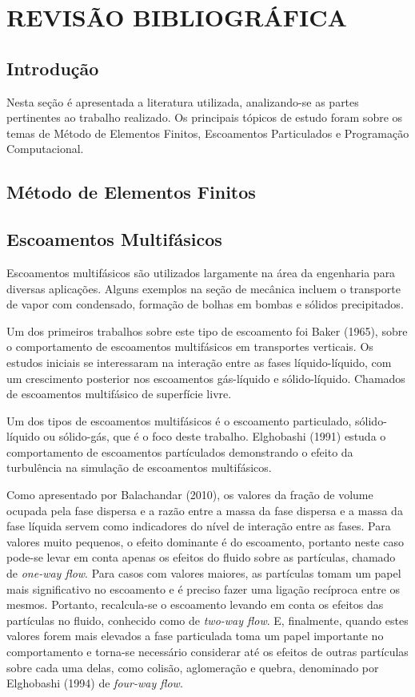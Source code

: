 \chapter{REVISÃO BIBLIOGRÁFICA}
\label{rev_bib}
\section{\textbf{Introdução}}
Nesta seção é apresentada a literatura utilizada, analizando-se as partes pertinentes ao trabalho realizado. Os principais tópicos de estudo foram sobre os temas de Método de Elementos Finitos, Escoamentos Particulados e Programação Computacional. 

\section{\textbf{Método de Elementos Finitos}}


\section{\textbf{Escoamentos Multifásicos}}
Escoamentos multifásicos são utilizados largamente na área da engenharia para diversas aplicações.
Alguns exemplos na seção de mecânica incluem o transporte de vapor com condensado, formação de bolhas em bombas e sólidos precipitados.

Um dos primeiros trabalhos sobre este tipo de escoamento foi Baker (1965)\cite{Baker-1965}, sobre o comportamento de escoamentos multifásicos em transportes verticais.
Os estudos iniciais se interessaram na interação entre as fases líquido-líquido, com um crescimento posterior nos escoamentos gás-líquido e sólido-líquido.
Chamados de escoamentos multifásico de superfície livre.

Um dos tipos de escoamentos multifásicos é o escoamento particulado, sólido-líquido ou sólido-gás, que é o foco deste trabalho.
Elghobashi (1991)\cite{Elghobashi-1991} estuda o comportamento de escoamentos partículados demonstrando o efeito da turbulência na simulação de escoamentos multifásicos.

Como apresentado por Balachandar (2010)\cite{Balachandar-2010}, os valores da fração de volume ocupada pela fase dispersa e a razão entre a massa da fase dispersa e a massa da fase líquida servem como indicadores do nível de interação entre as fases.
Para valores muito pequenos, o efeito dominante é do escoamento, portanto neste caso pode-se levar em conta apenas os efeitos do fluido sobre as partículas, chamado de \textit{one-way flow}.
Para casos com valores maiores, as partículas tomam um papel mais significativo no escoamento e é preciso fazer uma ligação recíproca entre os mesmos.
Portanto, recalcula-se o escoamento levando em conta os efeitos das partículas no fluido, conhecido como de \textit{two-way flow}.
E, finalmente, quando estes valores forem mais elevados a fase particulada toma um papel importante no comportamento e torna-se necessário considerar até os efeitos de outras partículas sobre cada uma delas, como colisão, aglomeração e quebra, denominado por Elghobashi (1994)\cite{Elghobashi-1994} de \textit{four-way flow}.

